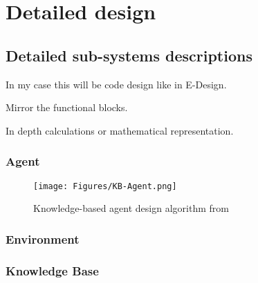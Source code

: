 \chapter{Detailed design} 
\label{Detailed_design}









\section{Detailed sub-systems descriptions}

In my case this will be code design like in E-Design.

Mirror the functional blocks.

In depth calculations or mathematical representation.

\subsection{Agent}

\begin{figure}[H]
    \centering
    \texttt{[image: Figures/KB-Agent.png]}
    \caption{Knowledge-based agent design algorithm from \cite{russell2016artificial}}
    \label{fig:sysdiag}
\end{figure}



\subsection{Environment}

\subsection{Knowledge Base}

